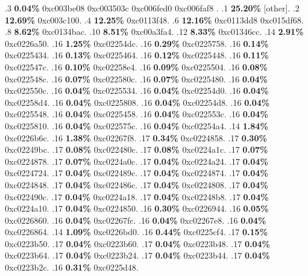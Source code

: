 \begin{profile}
{.3 \textbf{0.04\%} 0xc003be08\newline {} 0xc003503c\newline {} 0xc006fed0\newline {} 0xc006faf8\newline {} . 
.1 \textbf{25.20\%} [other]. 
.2 \textbf{12.69\%} 0xc003c100. 
.4 \textbf{12.25\%} 0xc0113f48. 
.6 \textbf{12.16\%} 0xc0113dd8\newline {} 0xc015df68. 
.8 \textbf{8.62\%} 0xc0134bac. 
.10 \textbf{8.51\%} 0xc00a3fa4. 
.12 \textbf{8.33\%} 0xc01346cc. 
.14 \textbf{2.91\%} 0xc0226a50. 
.16 \textbf{1.25\%} 0xc02254dc. 
.16 \textbf{0.29\%} 0xc0225758. 
.16 \textbf{0.14\%} 0xc0225434. 
.16 \textbf{0.13\%} 0xc0225464. 
.16 \textbf{0.12\%} 0xc0225448. 
.16 \textbf{0.11\%} 0xc022547c. 
.16 \textbf{0.10\%} 0xc02258e4. 
.16 \textbf{0.09\%} 0xc0225504. 
.16 \textbf{0.08\%} 0xc022548c. 
.16 \textbf{0.07\%} 0xc022580c. 
.16 \textbf{0.07\%} 0xc0225480. 
.16 \textbf{0.04\%} 0xc022550c. 
.16 \textbf{0.04\%} 0xc0225534. 
.16 \textbf{0.04\%} 0xc02254d0. 
.16 \textbf{0.04\%} 0xc02258d4. 
.16 \textbf{0.04\%} 0xc0225808. 
.16 \textbf{0.04\%} 0xc02254d8. 
.16 \textbf{0.04\%} 0xc0225548. 
.16 \textbf{0.04\%} 0xc0225458. 
.16 \textbf{0.04\%} 0xc022553c. 
.16 \textbf{0.04\%} 0xc0225810. 
.16 \textbf{0.04\%} 0xc022575c. 
.16 \textbf{0.04\%} 0xc02254a4. 
.14 \textbf{1.84\%} 0xc0226b6c. 
.16 \textbf{1.38\%} 0xc02267f8. 
.17 \textbf{0.34\%} 0xc0224858. 
.17 \textbf{0.30\%} 0xc02249bc. 
.17 \textbf{0.08\%} 0xc022480c. 
.17 \textbf{0.08\%} 0xc0224a1c. 
.17 \textbf{0.07\%} 0xc0224878. 
.17 \textbf{0.07\%} 0xc0224a0c. 
.17 \textbf{0.04\%} 0xc0224a24. 
.17 \textbf{0.04\%} 0xc0224724. 
.17 \textbf{0.04\%} 0xc022489c. 
.17 \textbf{0.04\%} 0xc0224874. 
.17 \textbf{0.04\%} 0xc0224848. 
.17 \textbf{0.04\%} 0xc022486c. 
.17 \textbf{0.04\%} 0xc0224808. 
.17 \textbf{0.04\%} 0xc022490c. 
.17 \textbf{0.04\%} 0xc0224a18. 
.17 \textbf{0.04\%} 0xc02248b8. 
.17 \textbf{0.04\%} 0xc0224a10. 
.17 \textbf{0.04\%} 0xc0224850. 
.16 \textbf{0.30\%} 0xc0226944. 
.16 \textbf{0.05\%} 0xc0226860. 
.16 \textbf{0.04\%} 0xc02267fc. 
.16 \textbf{0.04\%} 0xc02267e8. 
.16 \textbf{0.04\%} 0xc0226864. 
.14 \textbf{1.09\%} 0xc0226bd0. 
.16 \textbf{0.44\%} 0xc0225cf4. 
.17 \textbf{0.15\%} 0xc0223b50. 
.17 \textbf{0.04\%} 0xc0223b60. 
.17 \textbf{0.04\%} 0xc0223b48. 
.17 \textbf{0.04\%} 0xc0223b64. 
.17 \textbf{0.04\%} 0xc0223b24. 
.17 \textbf{0.04\%} 0xc0223b44. 
.17 \textbf{0.04\%} 0xc0223b2c. 
.16 \textbf{0.31\%} 0xc0225d48. 
}
\end{profile}
